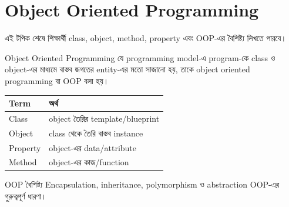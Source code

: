 \section{Object Oriented Programming}

\begin{learningbox}
এই টপিক শেষে শিক্ষার্থী class, object, method, property এবং OOP-এর বৈশিষ্ট্য লিখতে পারবে।
\end{learningbox}

\begin{definitionbox}{Object Oriented Programming}
যে programming model-এ program-কে class ও object-এর মাধ্যমে বাস্তব জগতের entity-এর মতো সাজানো হয়, তাকে object oriented programming বা OOP বলা হয়।
\end{definitionbox}

\begin{center}
\begin{tabular}{|p{}|p{}|}
\hline
\textbf{Term} & \textbf{অর্থ} \\
\hline
Class & object তৈরির template/blueprint \\
\hline
Object & class থেকে তৈরি বাস্তব instance \\
\hline
Property & object-এর data/attribute \\
\hline
Method & object-এর কাজ/function \\
\hline
\end{tabular}
\end{center}

\begin{keypointbox}{OOP বৈশিষ্ট্য}
Encapsulation, inheritance, polymorphism ও abstraction OOP-এর গুরুত্বপূর্ণ ধারণা।
\end{keypointbox}
